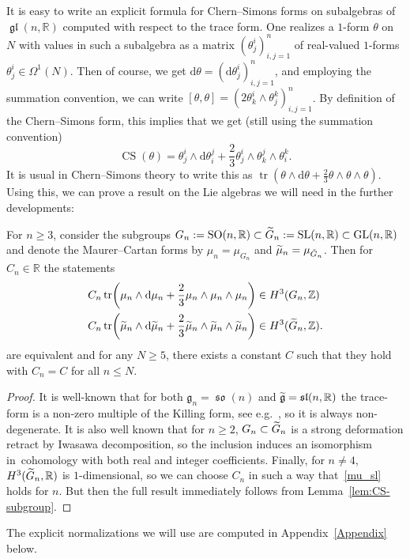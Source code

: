 \documentclass[AHL,Unicode,longabstracts]{cedram}
\renewcommand{\th}{\theta}
\newcommand{\Om}{\Omega}
\DeclareMathOperator{\CS}{CS}
\DeclareMathOperator{\SO}{SO}
\DeclareMathOperator{\SL}{SL}
\DeclareMathOperator{\GL}{GL}
\DeclareMathOperator{\tr}{tr}
\DeclareMathOperator{\fkgl}{\mathfrak{gl}}
\DeclareMathOperator{\fkso}{\mathfrak{so}}
\DeclareMathOperator{\fksl}{\mathfrak{sl}}
\renewcommand*{\d}{\mathrm{d}}
\newcommand*{\R}{\mathbb{R}}
\newcommand{\Z}{\mathbb{Z}}
\newcommand{\fkg}{\mathfrak{g}}
\let\originalleft\left
\let\originalright\right
\renewcommand{\left}{\mathopen{}\mathclose\bgroup\originalleft}
\renewcommand{\right}{\aftergroup\egroup\originalright}
\let\oldtilde\tilde
\renewcommand*{\tilde}[1]{\mathchoice{\widetilde{#1}}{\widetilde{#1}}{\oldtilde{#1}}{\oldtilde{#1}}}
\newcommand*{\R}{\mathbb{R}}
\begin{document}
It is easy to write an explicit formula for Chern--Simons forms on subalgebras of $\fkgl(n,\R)$ computed with respect to the trace form. One realizes a $1$-form $\th$ on $N$ with values in such a subalgebra as a matrix $(\th^i_j)_{i,j=1}^n$ of real-valued $1$-forms $\th^i_j\in\Om^1(N)$. Then of course, we get $\d\th=(\d\th^i_j)_{i,j=1}^n$, and employing the summation convention, we can write $[\th,\th]=(2\th^i_k\wedge\th^k_j)_{i,j=1}^n$. By definition of the Chern--Simons form, this implies that we get (still using the summation convention)
\[
\CS(\th)=\th^i_j\wedge\d\th^j_i+\frac{2}{3}\th^i_j\wedge\th^j_k\wedge\th^k_i.
\]
It is usual in Chern--Simons theory to write this as $\tr(\th\wedge
\d\th+\frac{2}{3}\th\wedge\th\wedge\th)$. Using this, we can prove a result on the Lie algebras we will need in the further developments:

\begin{prop}\label{prop:sl-so}
For $n\geqslant 3$, consider the subgroups $G_n:=\SO(n,\R)\subset\tilde G_n:=\SL(n,\R)\subset \GL(n,\R)$ and denote the Maurer--Cartan forms by $\mu_n=\mu_{G_n}$ and $\tilde\mu_n=\mu_{\tilde G_n}$. Then for $C_n\in\R$ the statements
\begin{align}
C_n\tr\left(\mu_n\wedge \d\mu_n+\frac{2}{3}\mu_n\wedge\mu_n\wedge\mu_n\right) &\in H^3(G_n,\Z)\label{mu_so}\\
C_n\tr\left(\tilde\mu_n\wedge
\d\tilde\mu_n+\frac{2}{3}\tilde\mu_n\wedge\tilde\mu_n\wedge\tilde\mu_n\right) &\in H^3(\tilde G_n,\Z)\label{mu_sl}.
\end{align}
are equivalent and for any $N\geqslant 5$, there exists a constant $C$ such that they hold with $C_n=C$ for all $n\leqslant N$.
\end{prop}


\begin{proof}
It is well-known that for both $\fkg_n=\fkso(n)$ and $\tilde{\fkg}=\fksl(n,\R)$ the trace-form is a non-zero multiple of the Killing form, see e.g.~\cite{MR1153249}, so it is always non-degenerate. It is also well known that for $n\geqslant 2$, $G_n\subset\tilde G_n$ is a strong deformation retract by Iwasawa decomposition, so the inclusion induces an isomorphism in~cohomology with both real and integer coefficients. Finally, for $n\neq 4$, $H^3(\tilde G_n,\R)$ is $1$-dimensional, so we can choose $C_n$ in such a way that~\eqref{mu_sl} holds for $n$. But then the full result immediately follows from Lemma~\ref{lem:CS-subgroup}.
\end{proof}

The explicit normalizations we will use are computed in Appendix~\ref{Appendix} below.
\end{document}

